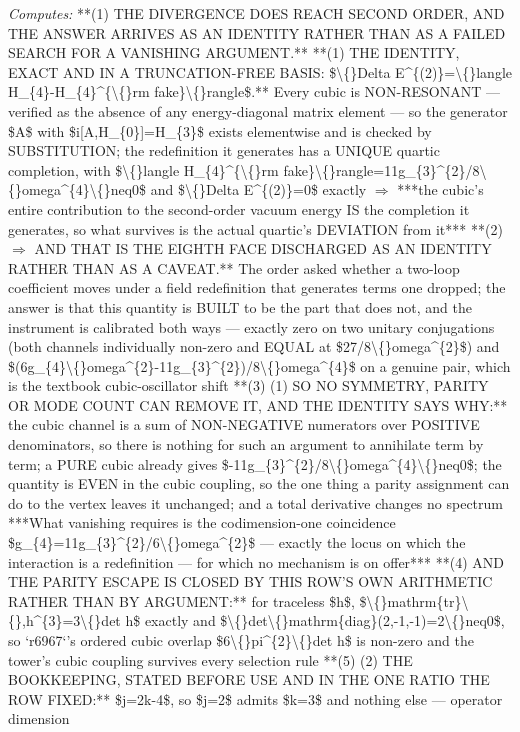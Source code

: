 \begin{description}
\emph{Computes:} **(1) THE DIVERGENCE DOES REACH SECOND ORDER, AND THE ANSWER ARRIVES AS AN IDENTITY RATHER THAN AS A FAILED SEARCH FOR A VANISHING ARGUMENT.**  **(1)  THE IDENTITY, EXACT AND IN A TRUNCATION-FREE BASIS: \$\textbackslash\{\}Delta E\textasciicircum{}\{(2)\}=\textbackslash\{\}langle H\_\{4\}-H\_\{4\}\textasciicircum{}\{\textbackslash\{\}rm fake\}\textbackslash\{\}rangle\$.** Every cubic is NON-RESONANT --- verified as the absence of any energy-diagonal matrix element --- so the generator \$A\$ with \$i[A,H\_\{0\}]=H\_\{3\}\$ exists elementwise and is checked by SUBSTITUTION; the redefinition it generates has a UNIQUE quartic completion, with \$\textbackslash\{\}langle H\_\{4\}\textasciicircum{}\{\textbackslash\{\}rm fake\}\textbackslash\{\}rangle=11g\_\{3\}\textasciicircum{}\{2\}/8\textbackslash\{\}omega\textasciicircum{}\{4\}\textbackslash\{\}neq0\$ and \$\textbackslash\{\}Delta E\textasciicircum{}\{(2)\}=0\$ exactly \ensuremath{\Rightarrow} ***the cubic's entire contribution to the second-order vacuum energy IS the completion it generates, so what survives is the actual quartic's DEVIATION from it***  **(2) \ensuremath{\Rightarrow} AND THAT IS THE EIGHTH FACE DISCHARGED AS AN IDENTITY RATHER THAN AS A CAVEAT.** The order asked whether a two-loop coefficient moves under a field redefinition that generates terms one dropped; the answer is that this quantity is BUILT to be the part that does not, and the instrument is calibrated both ways --- exactly zero on two unitary conjugations (both channels individually non-zero and EQUAL at \$27/8\textbackslash\{\}omega\textasciicircum{}\{2\}\$) and \$(6g\_\{4\}\textbackslash\{\}omega\textasciicircum{}\{2\}-11g\_\{3\}\textasciicircum{}\{2\})/8\textbackslash\{\}omega\textasciicircum{}\{4\}\$ on a genuine pair, which is the textbook cubic-oscillator shift  **(3) (1) SO NO SYMMETRY, PARITY OR MODE COUNT CAN REMOVE IT, AND THE IDENTITY SAYS WHY:** the cubic channel is a sum of NON-NEGATIVE numerators over POSITIVE denominators, so there is nothing for such an argument to annihilate term by term; a PURE cubic already gives \$-11g\_\{3\}\textasciicircum{}\{2\}/8\textbackslash\{\}omega\textasciicircum{}\{4\}\textbackslash\{\}neq0\$; the quantity is EVEN in the cubic coupling, so the one thing a parity assignment can do to the vertex leaves it unchanged; and a total derivative changes no spectrum  ***What vanishing requires is the codimension-one coincidence \$g\_\{4\}=11g\_\{3\}\textasciicircum{}\{2\}/6\textbackslash\{\}omega\textasciicircum{}\{2\}\$ --- exactly the locus on which the interaction is a redefinition --- for which no mechanism is on offer***  **(4) AND THE PARITY ESCAPE IS CLOSED BY THIS ROW'S OWN ARITHMETIC RATHER THAN BY ARGUMENT:** for traceless \$h\$, \$\textbackslash\{\}mathrm\{tr\}\textbackslash\{\},h\textasciicircum{}\{3\}=3\textbackslash\{\}det h\$ exactly and \$\textbackslash\{\}det\textbackslash\{\}mathrm\{diag\}(2,-1,-1)=2\textbackslash\{\}neq0\$, so `r6967`'s ordered cubic overlap \$6\textbackslash\{\}pi\textasciicircum{}\{2\}\textbackslash\{\}det h\$ is non-zero and the tower's cubic coupling survives every selection rule  **(5) (2) THE BOOKKEEPING, STATED BEFORE USE AND IN THE ONE RATIO THE ROW FIXED:** \$j=2k-4\$, so \$j=2\$ admits \$k=3\$ and nothing else --- operator dimension 
\end{description}
